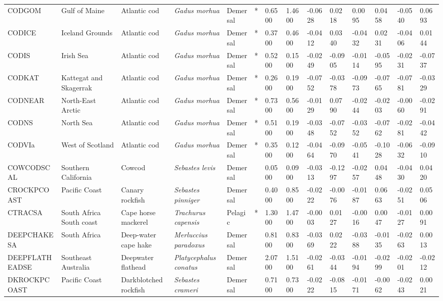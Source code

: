 \begin{longtable}{p{2.6cm}p{1.9cm}p{1.7cm}p{1.6cm}p{1cm}p{0.3cm}p{1cm}p{1cm}p{1cm}p{1.1cm}p{1cm}p{1.1cm}p{1cm}p{1.1cm}}
  CODGOM & Gulf of Maine & Atlantic cod & \textit{Gadus morhua} & Demersal & * & 0.6500 & 1.4600 & -0.0628 & 0.0218 & 0.0095 & 0.0458 & -0.0540 & 0.0693 \\ 
  CODICE & Iceland Grounds & Atlantic cod & \textit{Gadus morhua} & Demersal & * & 0.3700 & 0.4600 & -0.0412 & 0.0340 & -0.0432 & 0.0231 & -0.0406 & 0.0144 \\ 
  CODIS & Irish Sea & Atlantic cod & \textit{Gadus morhua} & Demersal & * & 0.5200 & 0.1500 & -0.0249 & -0.0905 & -0.0114 & -0.0595 & -0.0231 & -0.0737 \\ 
  CODKAT & Kattegat and Skagerrak & Atlantic cod & \textit{Gadus morhua} & Demersal & * & 0.2600 & 0.1900 & -0.0752 & -0.0378 & -0.0973 & -0.0765 & -0.0781 & -0.0329 \\ 
  CODNEAR & North-East Arctic & Atlantic cod & \textit{Gadus morhua} & Demersal & * & 0.7300 & 0.5600 & -0.0129 & 0.0790 & -0.0244 & -0.0203 & -0.0060 & -0.0291 \\ 
  CODNS & North Sea & Atlantic cod & \textit{Gadus morhua} & Demersal & * & 0.5100 & 0.1900 & -0.0348 & -0.0752 & -0.0352 & -0.0762 & -0.0281 & -0.0442 \\ 
  CODVIa & West of Scotland & Atlantic cod & \textit{Gadus morhua} & Demersal & * & 0.3500 & 0.1200 & -0.0464 & -0.0970 & -0.0541 & -0.1028 & -0.0632 & -0.0910 \\ 
  COWCODSCAL & Southern California & Cowcod & \textit{Sebastes levis} & Demersal &   & 0.0500 & 0.0900 & -0.0313 & -0.1297 & -0.0257 & 0.0448 & -0.0430 & 0.0420 \\ 
  CROCKPCOAST & Pacific Coast & Canary rockfish & \textit{Sebastes pinniger} & Demersal &   & 0.4000 & 0.8500 & -0.0222 & -0.0076 & -0.0187 & 0.0663 & -0.0251 & 0.0506 \\ 
  CTRACSA & South Africa South coast & Cape horse mackerel & \textit{Trachurus capensis} & Pelagic & * & 1.3000 & 1.4700 & -0.0003 & 0.0127 & -0.0016 & 0.0047 & -0.0127 & 0.0091 \\ 
  DEEPCHAKESA & South Africa & Deep-water cape hake & \textit{Merluccius paradoxus} & Demersal &   & 0.8100 & 0.8300 & -0.0369 & 0.0222 & -0.0388 & -0.0135 & -0.0263 & 0.0013 \\ 
  DEEPFLATHEADSE & Southeast Australia & Deepwater flathead & \textit{Platycephalus conatus} & Demersal &   & 2.0700 & 1.5100 & -0.0261 & -0.0344 & -0.0194 & -0.0299 & -0.0201 & -0.0212 \\ 
  DKROCKPCOAST & Pacific Coast & Darkblotched rockfish & \textit{Sebastes crameri} & Demersal &   & 0.7100 & 0.7300 & -0.0222 & -0.0815 & -0.0171 & -0.0062 & -0.0243 & 0.0021 \\ 

\end{longtable}
